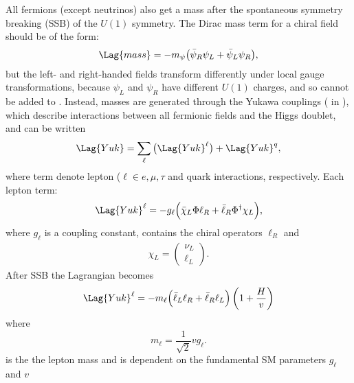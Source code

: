 All fermions (except neutrinos) also get a mass after the spontaneous symmetry breaking (SSB) of
the $U(1)$ symmetry.
The Dirac mass term for a chiral field should be of the form:
\begin{equation}
  \Lag{mass} = -m_\psi\big(\bar\psi_R\psi_L + \bar\psi_L\psi_R\big),
\end{equation}
but the left- and right-handed fields
transform differently under local gauge transformations,
because $\psi_L$ and $\psi_R$ have different $U(1)$ charges, %
and so cannot be added to .
Instead, masses are generated through the Yukawa couplings ( in ), which
describe interactions between all fermionic fields and the Higgs doublet, and can be written
\begin{equation}
  \Lag{Yuk} = \sum_{\ell}\big(\Lag{Yuk}^\ell\big) + \Lag{Yuk}^q,
  \label{eq:th:yukking}
\end{equation}
where term denote lepton ($\ell\in{e,\mu,\tau}$ and quark interactions, respectively.
%
Each lepton term:
\begin{equation}
  \Lag{Yuk}^\ell
  = - g_\ell\Big(\bar\chi_L\Phi \ell_R + \bar \ell_R\Phi^\dagger\chi_L\Big),
\end{equation}
where $g_\ell$ is a coupling constant, contains the chiral operators $\ell_R$ and
\begin{align}
  \chi_L = \begin{pmatrix}\nu_L \\ \ell_L \end{pmatrix}.
\end{align}
After SSB the Lagrangian becomes
\begin{align}
  \Lag{Yuk}^\ell
  = - m_\ell \Big(\bar\ell_L\ell_R + \bar\ell_R\ell_L\Big)%
  \left(1 + \frac{H}{v}\right)
\end{align}
where
\begin{equation}
  m_\ell = \frac{1}{\sqrt{2}}vg_\ell.
  \label{eq:leptonmass}
\end{equation}
is the the lepton mass and is dependent on the fundamental SM parameters $g_\ell$ and $v$


